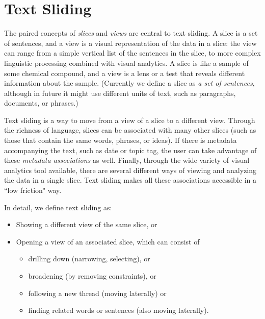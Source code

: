 \documentclass{sig-alternate}
\begin{document}
\section{Text Sliding}

The paired concepts of \emph{slices} and \emph{views} are central to text sliding. A slice is a set of sentences, and a view is a visual representation of the data in a slice: the view can range from a simple vertical list of the sentences in the slice, to more complex linguistic processing combined with visual analytics.  A slice is like a sample of some chemical compound,  and a view is a lens or a test that reveals different information about the sample. (Currently we define a slice as \emph{a set of sentences}, although in future it might use different units of text, such as paragraphs, documents, or phrases.) 


Text sliding is a way to move from a view of a slice to a different view. Through the richness of language, slices can be associated with many other slices (such as those that contain the same  words, phrases, or ideas). If there is metadata accompanying the text, such as date or topic tag, the user can take advantage of these  \emph{metadata associations} as well.  Finally, through the wide variety of visual analytics tool available, there are several different ways of viewing and analyzing the data in a single slice. Text sliding makes all these associations accessible in a ``low friction" way.

In detail, we define text sliding as:
\begin{itemize}
	\item Showing a different view of the same slice, or
	\item Opening a  view of an associated slice, which can consist of
	\begin{itemize}
	  \item drilling down (narrowing, selecting), or
	  \item broadening (by removing constraints), or
	  \item following a new thread (moving laterally) or
	  \item finding related words or sentences  (also moving laterally).
	 \end{itemize}
\end{itemize}
\end{document}
